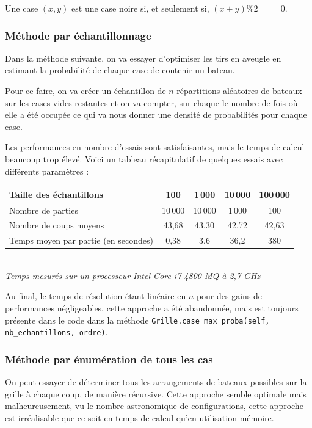 Une case $(x,y)$ est une case noire si, et seulement si, $(x+y)\%2==0$.

\subsubsection{Méthode par échantillonnage}
Dans la méthode suivante, on va essayer d'optimiser les tirs en aveugle en estimant la probabilité de chaque case de contenir un bateau.

Pour ce faire, on va créer un échantillon de $n$ répartitions aléatoires de bateaux sur les cases vides restantes et on va compter, sur chaque le nombre de fois où elle a été occupée ce qui va nous donner une densité de probabilités pour chaque case. 

Les performances en nombre d'essais sont satisfaisantes, mais le temps de calcul beaucoup trop élevé. Voici un tableau récapitulatif de quelques essais avec différents paramètres :

\medskip

\begin{center}
\begin{tabular}{|l|c|c|c|c|}
\hline
Taille des échantillons & 100 & 1\,000 & 10\,000 & 100\,000\\
\hline
Nombre de parties & 10\,000 & 10\,000 & 1\,000 & 100\\
\hline
Nombre de coups moyens & 43,68 & 43,30 & 42,72 & 42,63\\
\hline
Temps moyen par partie (en secondes) & 0,38 & 3,6 & 36,2 & 380\\
\hline 
\end{tabular}\\
\vspace*{0.1cm}
\textit{Temps mesurés sur un processeur Intel Core i7 4800-MQ à 2,7 GHz}
\end{center}

\medskip

Au final, le temps de résolution étant linéaire en $n$ pour des gains de performances négligeables, cette approche a été abandonnée, mais est toujours présente dans le code  dans la méthode \texttt{Grille.case\_max\_proba(self, nb\_echantillons, ordre)}.

\subsubsection{Méthode par énumération de tous les cas}

On peut essayer de déterminer tous les arrangements de bateaux possibles sur la grille à chaque coup, de manière récursive. Cette approche semble optimale mais malheureusement, vu le nombre astronomique de configurations, cette approche est irréalisable que ce soit en temps de calcul qu'en utilisation mémoire. 

